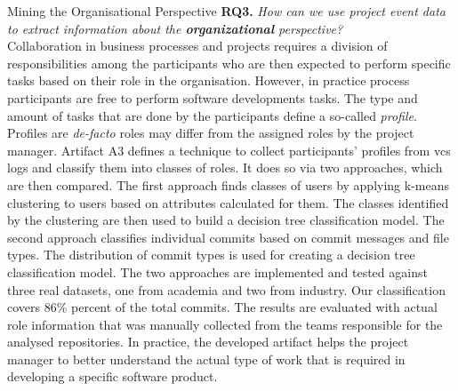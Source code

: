 \begin{question}{Mining the Organisational Perspective}
	\textbf{RQ3.} \emph{How can we use project event data to extract information about the \textbf{organizational} perspective?}\\
	
	
	Collaboration in business processes and projects requires a division of responsibilities among the participants who are then expected to perform specific tasks based on their role in the organisation. However, in practice process participants are free to perform software developments tasks. The type and amount of tasks that are done by the participants define a so-called \emph{profile}. Profiles are \emph{de-facto} roles may differ from the assigned roles by the project manager. Artifact A3 defines a technique to collect participants' profiles from \gls{vcs} logs and classify them into classes of roles. It does so via two approaches, which are then compared. The first approach finds classes of users by applying k-means clustering to users based on attributes calculated for them. The classes identified by the clustering are then used to build a decision tree classification model. The second approach classifies individual commits based on commit messages and file types. The distribution of commit types is used for creating a decision tree classification model. The two approaches are implemented and tested against three real datasets, one from academia and two from industry. Our classification covers 86\% percent of the total commits. The results are evaluated with actual role information that was manually collected from the teams responsible for the analysed repositories. In practice, the developed artifact helps the project manager to better understand the actual type of work that is required in developing a specific software product.
\end{question}

 


